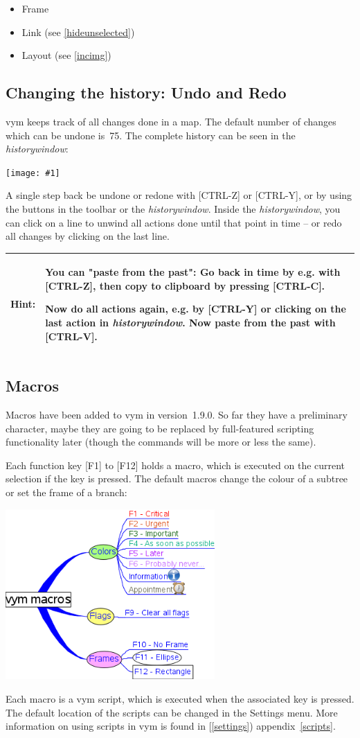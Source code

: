 \documentclass[12pt,a4paper]{article}
\newcommand{\maximage}[1]{  
    \begin{center}
        \texttt{[image: \#1]} 
    \end{center}
}
\newcommand{\hint}[1]{
    \begin{center} 
        \begin{tabular}{|rp{12cm}|} \hline
            {\bf Hint}:& #1\\   \hline
        \end{tabular}
            \marginpar{\Huge !} 
    \end{center} 
}
\newcommand{\vym}{{\sc vym }}
\newcommand{\key}[1]{[#1]}
\begin{document}
\begin{itemize}
    \item Frame
    \item Link (see \ref{hideunselected})
    \item Layout (see \ref{incimg})
\end{itemize}

\subsection{Changing the history: Undo and Redo}
\vym keeps track of all changes done in a map. The default number of
changes which can be undone is~75. The complete history can be seen in
the {\em historywindow}:
    \maximage{images/historywindow.png}
    \label{historywindow}
A single step back be undone or redone with \key{CTRL-Z} or \key{CTRL-Y},
or by using the buttons in the toolbar or the {\em historywindow}.
Inside the {\em historywindow}, you can click on a line to unwind all
actions done until that point in time -- or redo all changes by clicking
on the last line.

\hint{
    You can "paste from the past": Go back in time by e.g. with
    \key{CTRL-Z}, then copy to clipboard by pressing \key{CTRL-C}.

    Now do all actions again, e.g. by \key{CTRL-Y} or clicking on the
    last action in {\em historywindow}. Now paste from the past with
    \key{CTRL-V}.
}

\subsection{Macros} \label{macros}
Macros have been added to \vym in version~1.9.0. 
So far they have a preliminary character, maybe they are going to be
replaced by full-featured scripting functionality later (though the
commands will be more or less the same).

Each function key
\key{F1} to \key{F12} holds a macro, which is executed on the current
selection if the key is pressed. The default macros change the colour of
a subtree or set the frame of a branch:
\begin{center}
    \includegraphics[width=8cm]{images/macros.png}
\end{center}
Each macro is a \vym script, which is executed when the associated key
is pressed. The default location of the scripts can be changed in the
Settings menu. More information on using scripts in \vym is found in
[\ref{settings})
appendix~\ref{scripts}.
\end{document}

